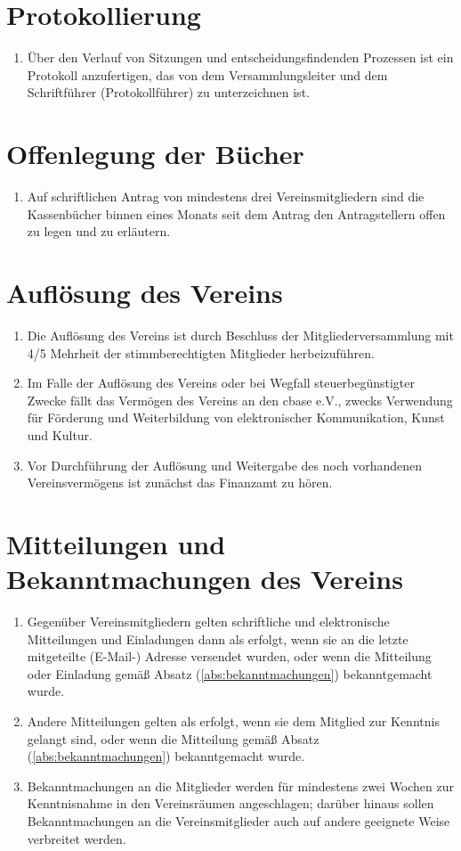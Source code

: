 \documentclass[ngerman]{scrartcl}
\begin{document}
\section{Protokollierung} \label{sec:protokollierung}
\begin{enumerate}
 \item Über den Verlauf von Sitzungen und entscheidungsfindenden
 Prozessen ist ein Protokoll anzufertigen, das von dem
 Versammlungsleiter und dem Schriftführer (Protokollführer) zu
 unterzeichnen ist.
\end{enumerate}
\section{Offenlegung der Bücher} \label{sec:offenlegung_der_buecher}
\begin{enumerate}
 \item Auf schriftlichen Antrag von mindestens drei
 Vereinsmitgliedern sind die Kassenbücher binnen eines Monats
 seit dem Antrag den Antragstellern offen zu legen und zu
 erläutern.
\end{enumerate}
\section{Auflösung des Vereins} \label{sec:aufloesung_des_vereins}
\begin{enumerate}
 \item Die Auflösung des Vereins ist durch Beschluss der
 Mitgliederversammlung mit 4/5 Mehrheit der stimmberechtigten
 Mitglieder herbeizuführen.
 \item Im Falle der Auflösung des Vereins oder bei Wegfall
 steuerbegünstigter Zwecke fällt das Vermögen des Vereins an
 den cbase e.V., zwecks Verwendung für Förderung und
 Weiterbildung von elektronischer Kommunikation, Kunst und
 Kultur.
 \item Vor Durchführung der Auflösung und Weitergabe des noch
 vorhandenen Vereinsvermögens ist zunächst das Finanzamt zu
 hören.
\end{enumerate}
\section{Mitteilungen und Bekanntmachungen des Vereins}
\label{sec:mitteilungen_und_bekanntmachungen_des_vereins}
\begin{enumerate}
 \item Gegenüber Vereinsmitgliedern gelten schriftliche und elektronische
 Mitteilungen und Einladungen dann als erfolgt, wenn sie an die letzte
 mitgeteilte (E-Mail-) Adresse versendet wurden, oder wenn die Mitteilung
 oder Einladung gemäß Absatz (\ref{abs:bekanntmachungen}) bekanntgemacht wurde.
 \item Andere Mitteilungen gelten als erfolgt, wenn sie dem
 Mitglied zur Kenntnis gelangt sind, oder wenn die Mitteilung
 gemäß Absatz (\ref{abs:bekanntmachungen}) bekanntgemacht wurde.
 \item \label{abs:bekanntmachungen}
 Bekanntmachungen an die Mitglieder werden für mindestens
 zwei Wochen zur Kenntnisnahme in den Vereinsräumen
 angeschlagen; darüber hinaus sollen Bekanntmachungen an die 
 Vereinsmitglieder auch auf andere geeignete Weise verbreitet
 werden.
\end{enumerate}
\end{document}
